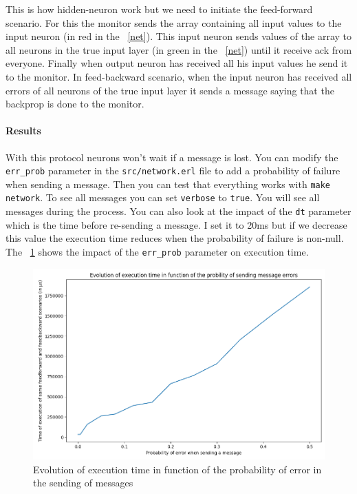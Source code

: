 \documentclass[12pt]{article}
\begin{document}
This is how hidden-neuron work but we need to initiate the feed-forward scenario. For this the monitor sends the array containing all input values to the input neuron (in red in the \figurename~\ref{net}). This input neuron sends values of the array to all neurons in the true input layer (in green in the \figurename~\ref{net}) until it receive ack from everyone. Finally when output neuron has received all his input values he send it to the monitor. In feed-backward scenario, when the input neuron has received all errors of all neurons of the true input layer it sends a message saying that the backprop is done to the monitor.

\paragraph{Results} With this protocol neurons won't wait if a message is lost. You can modify the \verb|err_prob| parameter in the \verb|src/network.erl| file to add a probability of failure when sending a message. Then you can test that everything works with \verb|make network|. To see all messages you can set \verb|verbose| to \verb|true|. You will see all messages during the process. You can also look at the impact of the \verb|dt| parameter which is the time before re-sending a message. I set it to 20ms but if we decrease this value the execution time reduces when the probability of failure is non-null. The \figurename~\ref{err_prob} shows the impact of the \verb|err_prob| parameter on execution time.

\begin{figure}
	\centering
	\includegraphics[scale=0.6]{prob_error.png}
	\captionsetup{justification=centering}
	\caption{Evolution of execution time in function of the probability of error in the sending of messages}
	\label{err_prob}
\end{figure}
\end{document}

